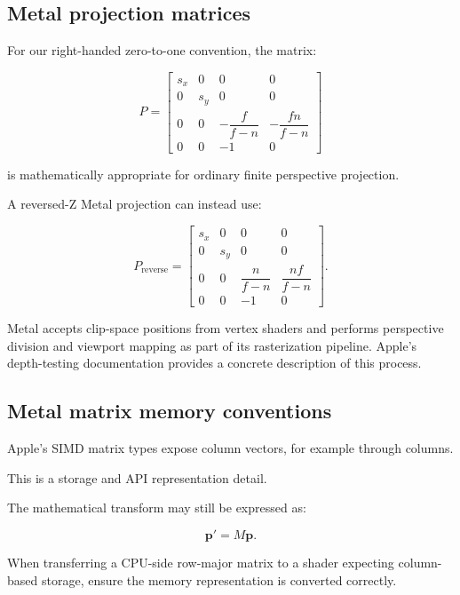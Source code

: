 \subsection{Metal projection matrices}\label{02-foundations-ii-ch033-metal-projection-matrices}

\hypertarget{02-foundations-ii-ch033-metal-projection-matrices}{}

For our right-handed zero-to-one convention, the matrix:

\[
 P= \begin{bmatrix} s_x&0&0&0\\ 0&s_y&0&0\\ 0&0&-\dfrac f{f-n}&-\dfrac{fn}{f-n}\\ 0&0&-1&0 \end{bmatrix}
\]

is mathematically appropriate for ordinary finite perspective projection.

A reversed-Z Metal projection can instead use:

\[
 P_{\mathrm{reverse}}= \begin{bmatrix} s_x&0&0&0\\ 0&s_y&0&0\\ 0&0&\dfrac n{f-n}&\dfrac{nf}{f-n}\\ 0&0&-1&0 \end{bmatrix}.
\]

Metal accepts clip-space positions from vertex shaders and performs perspective division and viewport mapping as part of its rasterization pipeline. Apple's depth-testing documentation provides a concrete description of this process. 

\subsection{Metal matrix memory conventions}\label{02-foundations-ii-ch033-metal-matrix-memory-conventions}

\hypertarget{02-foundations-ii-ch033-metal-matrix-memory-conventions}{}

Apple's SIMD matrix types expose column vectors, for example through  columns.

This is a storage and API representation detail.

The mathematical transform may still be expressed as:

\[
 \mathbf p'=M\mathbf p.
\]

When transferring a CPU-side row-major matrix to a shader expecting column-based storage, ensure the memory representation is converted correctly.

